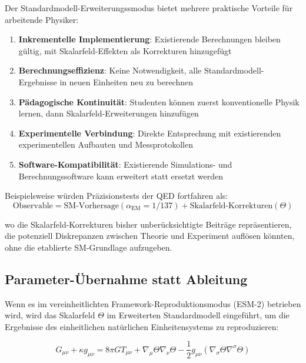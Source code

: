 \documentclass[12pt,a4paper]{article}
\newcommand{\alphaEM}{\alpha_{\text{EM}}}
\begin{document}
	Der Standardmodell-Erweiterungssmodus bietet mehrere praktische Vorteile für arbeitende Physiker:
	
	\begin{enumerate}
		\item \textbf{Inkrementelle Implementierung}: Existierende Berechnungen bleiben gültig, mit Skalarfeld-Effekten als Korrekturen hinzugefügt
		\item \textbf{Berechnungseffizienz}: Keine Notwendigkeit, alle Standardmodell-Ergebnisse in neuen Einheiten neu zu berechnen
		\item \textbf{Pädagogische Kontinuität}: Studenten können zuerst konventionelle Physik lernen, dann Skalarfeld-Erweiterungen hinzufügen
		\item \textbf{Experimentelle Verbindung}: Direkte Entsprechung mit existierenden experimentellen Aufbauten und Messprotokollen
		\item \textbf{Software-Kompatibilität}: Existierende Simulations- und Berechnungssoftware kann erweitert statt ersetzt werden
	\end{enumerate}
	
	Beispielsweise würden Präzisionstests der QED fortfahren als:
	\begin{equation}
		\text{Observable} = \text{SM-Vorhersage}(\alphaEM = 1/137) + \text{Skalarfeld-Korrekturen}(\Theta)
	\end{equation}
	
	wo die Skalarfeld-Korrekturen bisher unberücksichtigte Beiträge repräsentieren, die potenziell Diskrepanzen zwischen Theorie und Experiment auflösen könnten, ohne die etablierte SM-Grundlage aufzugeben.
	
	\subsection{Parameter-Übernahme statt Ableitung}
	\label{subsec:parameter_adoption}
	
	Wenn es im vereinheitlichten Framework-Reproduktionsmodus (ESM-2) betrieben wird, wird das Skalarfeld $\Theta$ im Erweiterten Standardmodell eingeführt, um die Ergebnisse des einheitlichen natürlichen Einheitensystems zu reproduzieren:
	
	\begin{equation}
		G_{\mu\nu} + \kappa g_{\mu\nu} = 8\pi G T_{\mu\nu} + \nabla_{\mu}\Theta\nabla_{\nu}\Theta - \frac{1}{2}g_{\mu\nu}(\nabla_{\sigma}\Theta\nabla^{\sigma}\Theta)
	\end{equation}
	
\end{document}
